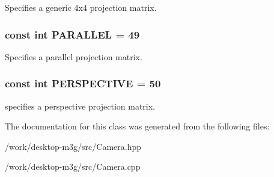 Specifies a generic 4x4 projection matrix. \hypertarget{classm3g_1_1Camera_d9630da0e9505afbb107c86229aa2f08}{
\subsubsection[{PARALLEL}]{\setlength{\rightskip}{0pt plus 5cm}const int {\bf PARALLEL} = 49}}
\label{classm3g_1_1Camera_d9630da0e9505afbb107c86229aa2f08}


Specifies a parallel projection matrix. \hypertarget{classm3g_1_1Camera_e62e72bde93e7d7ceb482e7a8c40dcf5}{
\subsubsection[{PERSPECTIVE}]{\setlength{\rightskip}{0pt plus 5cm}const int {\bf PERSPECTIVE} = 50}}
\label{classm3g_1_1Camera_e62e72bde93e7d7ceb482e7a8c40dcf5}


specifies a perspective projection matrix. 

The documentation for this class was generated from the following files:\begin{CompactItemize}
\item 
/work/desktop-m3g/src/Camera.hpp\item 
/work/desktop-m3g/src/Camera.cpp\end{CompactItemize}
